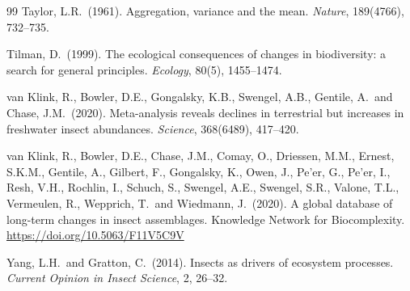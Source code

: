 \documentclass[11pt]{article}
\begin{document}
\begin{thebibliography}{99}
Taylor, L.R.\ (1961). Aggregation, variance and the mean. \emph{Nature},
189(4766), 732--735.

Tilman, D.\ (1999). The ecological consequences of changes in
biodiversity: a search for general principles. \emph{Ecology}, 80(5),
1455--1474.

van Klink, R., Bowler, D.E., Gongalsky, K.B., Swengel, A.B., Gentile, A.\
and Chase, J.M.\ (2020). Meta-analysis reveals declines in terrestrial
but increases in freshwater insect abundances. \emph{Science}, 368(6489),
417--420.

van Klink, R., Bowler, D.E., Chase, J.M., Comay, O., Driessen, M.M.,
Ernest, S.K.M., Gentile, A., Gilbert, F., Gongalsky, K., Owen, J., Pe'er,
G., Pe'er, I., Resh, V.H., Rochlin, I., Schuch, S., Swengel, A.E.,
Swengel, S.R., Valone, T.L., Vermeulen, R., Wepprich, T.\ and Wiedmann, J.\
(2020). A global database of long-term changes in insect assemblages.
Knowledge Network for Biocomplexity.
\url{https://doi.org/10.5063/F11V5C9V}

Yang, L.H.\ and Gratton, C.\ (2014). Insects as drivers of ecosystem
processes. \emph{Current Opinion in Insect Science}, 2, 26--32.

\end{thebibliography}
\end{document}
